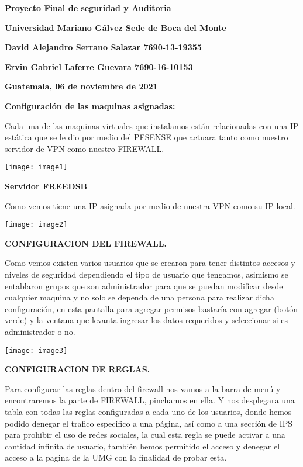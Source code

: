 




\textbf{Proyecto Final de seguridad y Auditoria}

\textbf{Universidad Mariano G\'{a}lvez Sede de Boca del Monte}

\textbf{David Alejandro Serrano Salazar 7690-13-19355}

\textbf{Ervin Gabriel Laferre Guevara 7690-16-10153}

\textbf{Guatemala, 06 de noviembre de 2021}

\textbf{}

\textbf{}

\textbf{Configuraci\'{o}n de las maquinas asignadas:}



Cada una de las maquinas virtuales que instalamos est\'{a}n relacionadas con una IP est\'{a}tica que se le dio por medio del PFSENSE que actuara tanto como nuestro servidor de VPN como nuestro FIREWALL.



\texttt{[image: image1]}

\textbf{Servidor FREEDSB}

Como vemos tiene una IP asignada por medio de nuestra VPN como su IP local.



\texttt{[image: image2]}



\textbf{CONFIGURACION DEL FIREWALL.}

Como vemos existen varios usuarios que se crearon para tener distintos accesos y niveles de seguridad dependiendo el tipo de usuario que tengamos, asimismo se entablaron grupos que son administrador para que se puedan modificar desde cualquier maquina y no solo se dependa de una persona para realizar dicha configuraci\'{o}n, en esta pantalla para agregar permisos bastar\'{i}a con agregar (bot\'{o}n verde) y la ventana que levanta ingresar los datos requeridos y seleccionar si es administrador o no.



\texttt{[image: image3]}



\textbf{CONFIGURACION DE REGLAS.}

Para configurar las reglas dentro del firewall nos vamos a la barra de men\'{u} y encontraremos la parte de FIREWALL, pinchamos en ella. Y nos desplegara una tabla con todas las reglas configuradas a cada uno de los usuarios, donde hemos podido denegar el trafico especifico a una p\'{a}gina, as\'{i} como a una secci\'{o}n de IPS para prohibir el uso de redes sociales, la cual esta regla se puede activar a una cantidad infinita de usuario, tambi\'{e}n hemos permitido el acceso y denegar el acceso a la pagina de la UMG con la finalidad de probar esta.

